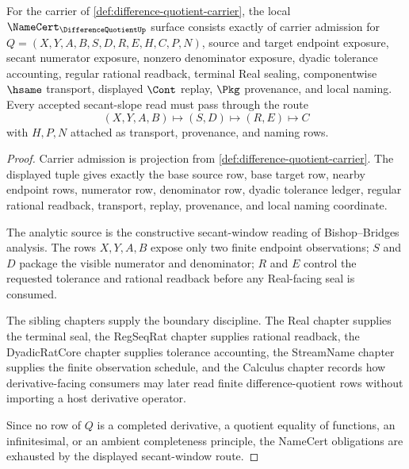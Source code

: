 \begin{theorem}
\label{thm:difference-quotient-namecert-obligations}
For the carrier of \autoref{def:difference-quotient-carrier}, the local $\NameCert_{\DifferenceQuotientUp}$ surface consists exactly of carrier admission for $Q=(X,Y,A,B,S,D,R,E,H,C,P,N)$, source and target endpoint exposure, secant numerator exposure, nonzero denominator exposure, dyadic tolerance accounting, regular rational readback, terminal Real sealing, componentwise $\hsame$ transport, displayed $\Cont$ replay, $\Pkg$ provenance, and local naming. Every accepted secant-slope read must pass through the route
$$
(X,Y,A,B) \longmapsto (S,D) \longmapsto (R,E) \longmapsto C
$$
with $H,P,N$ attached as transport, provenance, and naming rows.
\end{theorem}
\begin{proof}
Carrier admission is projection from \autoref{def:difference-quotient-carrier}. The displayed tuple gives exactly the base source row, base target row, nearby endpoint rows, numerator row, denominator row, dyadic tolerance ledger, regular rational readback, transport, replay, provenance, and local naming coordinate.

The analytic source is the constructive secant-window reading of Bishop--Bridges analysis. The rows $X,Y,A,B$ expose only two finite endpoint observations; $S$ and $D$ package the visible numerator and denominator; $R$ and $E$ control the requested tolerance and rational readback before any Real-facing seal is consumed.

The sibling chapters supply the boundary discipline. The Real chapter supplies the terminal seal, the RegSeqRat chapter supplies rational readback, the DyadicRatCore chapter supplies tolerance accounting, the StreamName chapter supplies the finite observation schedule, and the Calculus chapter records how derivative-facing consumers may later read finite difference-quotient rows without importing a host derivative operator.

Since no row of $Q$ is a completed derivative, a quotient equality of functions, an infinitesimal, or an ambient completeness principle, the NameCert obligations are exhausted by the displayed secant-window route.
\end{proof}

